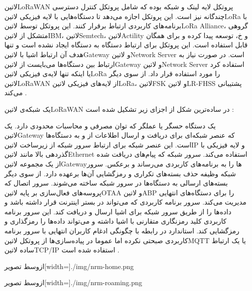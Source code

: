 ‌لاتین{LoRaWAN} پروتکل لایه لینک و شبکه بوده که شامل پروتکل کنترل دسترسی چندگانه نیز است.
این پروتکل اجازه می‌دهد تا دستگاه‌هایی با لایه فیزیکی ‌لاتین{LoRa} با برنامه‌های کاربردی ارتباط برقرار کنند.
این پروتکل توسط ‌لاتین{LoRa Alliance}، گروهی متشکل از ‌لاتین{IBM}، ‌لاتین{Semtech}، ‌لاتین{Actility} و ‌خ،
توسعه پیدا کرده و برای همگان قابل استفاده است.
این پروتکل برای ارتباط دستگاه به دستگاه ایجاد نشده است و تنها هدف آن ارتباط اشیا با ‌لاتین{Gateway} و ‌لاتین{Network Server} است.
در صورت نیاز به ارتباط بین دستگاه‌ها می‌بایست از ‌لاتین{Gateway} و ‌لاتین{Network Server} استفاده کرد یا اینکه
تنها لایه‌ی فیزیکی ‌لاتین{LoRa} را مورد استفاده قرار داد.
از سوی دیگر ‌لاتین{LoRaWAN} از لایه‌های فیزیکی ‌لاتین{LoRa}، ‌لاتین{FSK} و ‌لاتین{LR-FHSS} پشتیبانی می‌کند
.

یک شبکه‌ی ‌لاتین{LoRaWAN} در ساده‌ترین شکل از اجزای زیر تشکیل شده است :

 یک دستگاه حسگر یا عملگر که توان مصرفی و محاسبات محدودی دارد.
 یک ‌لاتین{Gateway} که عنصر شبکه‌ای برای دریافت و ارسال اطلاعات از و به دستگاه‌ها است. این عنصر شبکه برای ارتباط سرور شبکه
از زیرساخت ‌لاتین{IP} و لایه فیزیکی با گذردهی بالا مانند ‌لاتین{Ethernet} استفاده می‌کند.
 سرور شبکه که پیام‌های دریافت شده از یک مجموعه ‌لاتین{Gateway}ها را به برنامه‌های کاربردی می‌رساند و برعکس.
سرور شبکه وظیفه حذف بسته‌های تکراری
و رمزگشایی آن‌ها برعهده دارد. از سوی دیگر بسته‌های ارسالی به دستگاه‌ها در سرور شبکه ساخته می‌شوند.
 سرور اتصال که پروسه‌های فعال‌سازی بر پایه ‌لاتین{OTAA} و ‌لاتین{ABP} را برای دستگاه‌های انتهایی مدیریت می‌کند.
 سرور برنامه کاربردی که می‌تواند در بستر اینترنت قرار داشته باشد و داده‌ها را از طریق سرور شبکه برای اشیا ارسال و دریافت کند.
این سرور برنامه کاربردی کلید رمزنگاری متقارنی با اشیا داشته و می‌تواند داده‌ها را رمزگذاری و رمزگشایی کند. استاندارد در رابطه با چگونگی ادغام
کاربران انتهایی با سرور برنامه کاربردی صبحتی نکرده اما عموما در پیاده‌سازی‌ها از پروتکل ‌لاتین{MQTT} یا یک ارتباط ساده ‌لاتین{TCP/IP} استفاده شده است .

‌ازوسط
‌تصویر[width=\textwidth]{./img/nrm-home.png}

‌ازوسط
‌تصویر[width=\textwidth]{./img/nrm-roaming.png}

